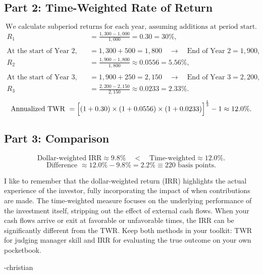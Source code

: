 \subsection*{Part 2: Time-Weighted Rate of Return}
\[
\text{We calculate subperiod returns for each year, assuming additions at period start.}
\]
\[
\begin{aligned}
R_1 &= \frac{1{,}300 - 1{,}000}{1{,}000} = 0.30 = 30\%,\\
& \\
\text{At the start of Year 2, total } &= 1{,}300 + 500 = 1{,}800 
\quad \rightarrow \quad \text{End of Year 2} = 1{,}900,\\
R_2 &= \frac{1{,}900 - 1{,}800}{1{,}800} \approx 0.0556 = 5.56\%,\\
& \\
\text{At the start of Year 3, total } &= 1{,}900 + 250 = 2{,}150 
\quad \rightarrow \quad \text{End of Year 3} = 2{,}200,\\
R_3 &= \frac{2{,}200 - 2{,}150}{2{,}150} \approx 0.0233 = 2.33\%.
\end{aligned}
\]
\[
\text{Annualized TWR } = \Bigl[(1 + 0.30)\times(1 + 0.0556)\times(1 + 0.0233)\Bigr]^{\frac{1}{3}} - 1 \approx 12.0\%.
\]

\subsection*{Part 3: Comparison}
\[
\text{Dollar-weighted IRR} \approx 9.8\%\quad <\quad \text{Time-weighted} \approx 12.0\%.
\]
\[
\text{Difference } \approx 12.0\% - 9.8\% = 2.2\% \equiv 220 \text{ basis points.}
\]

\begin{infobox}

I like to remember that the dollar-weighted return (IRR) highlights the actual experience of the investor, fully incorporating the impact of when contributions are made. The time-weighted measure focuses on the underlying performance of the investment itself, stripping out the effect of external cash flows. When your cash flows arrive or exit at favorable or unfavorable times, the IRR can be significantly different from the TWR. Keep both methods in your toolkit: TWR for judging manager skill and IRR for evaluating the true outcome on your own pocketbook.

-christian

\end{infobox}